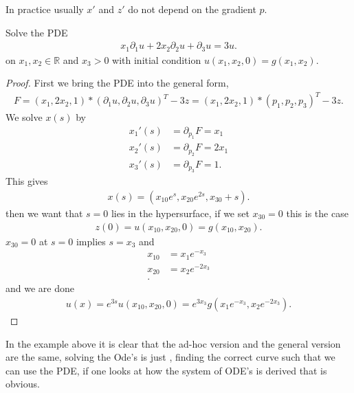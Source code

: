 \begin{corollary}
 In practice usually $x'$  and $z'$ do not depend on the gradient $p$. 
\end{corollary}
\begin{exercise}
 Solve the PDE 
 \begin{align*}
  x_{1} \partial_1 u + 2x_{2} \partial_2 u + \partial_3 u = 3u
 .\end{align*}
 on $x_{1},x_{2} \in  \mathbb{R}$ and $x_{3} >0$ with initial condition $u(x_{1},x_{2},0) = g(x_{1},x_{2})$.
\end{exercise}
\begin{proof}
 First we bring the PDE into the general form, 
 \begin{align*}
  F = (x_{1},2x_{2},1)*(\partial_{1}u,\partial_2 u,\partial_3 u)^T - 3z  =  (x_{1},2x_{2},1)*(p_{1},p_{2},p_{3})^T - 3z 
 .\end{align*}
 We solve $x(s)$ by 
 \begin{align*}
   x_1'(s) &= \partial_{p_1} F = x_{1}\\
   x_2'(s) &= \partial_{p_2} F = 2x_{1}\\
   x_3'(s) &= \partial_{p_3} F =1 
 .\end{align*}
 This gives 
 \begin{align*}
   x(s) = (x_{10}e^{s},x_{20}e^{2s},x_{30} + s  )
 .\end{align*}
 then we want that $s=0$ lies in the hypersurface, if we set $x_{30}=0$ this is the case 
 \begin{align*}
  z(0) = u(x_{10},x_{20},0   ) = g(x_{10},x_{20})
 .\end{align*}
 $x_{30} = 0$ at $s=0$ implies  $s=x_3$ and 
 \begin{align*}
   x_{10} &= x_{1} e^{-x_3} \\
   x_{20} &= x_{2} e^{-2x_3} \\
 .\end{align*}
 and we are done 
 \begin{align*}
   u(x) = e^{3s}u(x_{10},x_{20},0)  = e^{3x_3}g(x_{1}e^{-x_{3}},x_{2}e^{-2x_{3}}  ) 
 .\end{align*}
\end{proof}
\begin{note}
 In the example above it is clear that the ad-hoc version and the general version are the same,
 solving the Ode's is just , finding the correct curve such that we can use the PDE, if one looks at how the system of ODE's is derived
 that is obvious.
\end{note}
